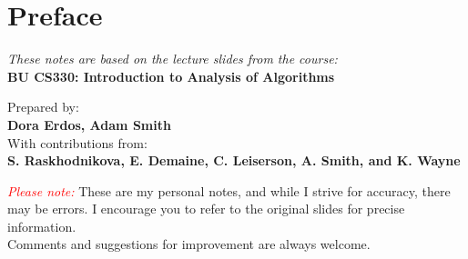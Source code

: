 \chapter*{Preface}

\begin{center}
    \vfill
    \textit{These notes are based on the lecture slides from the course:}\\
    \textbf{BU CS330: Introduction to Analysis of Algorithms}
    
    \vspace{1em}
    \small{
    Prepared by:\\
    \textbf{Dora Erdos, Adam Smith}\\
    With contributions from:\\
    \textbf{S. Raskhodnikova, E. Demaine, C. Leiserson, A. Smith, and K. Wayne}
    }

    \vspace{3em}
    \textcolor{red}{\textit{Please note:}} These are my personal notes, and while I strive for accuracy, there may be errors. I encourage you to refer to the original slides for precise information.\\
    Comments and suggestions for improvement are always welcome.
    \vfill
\end{center}
